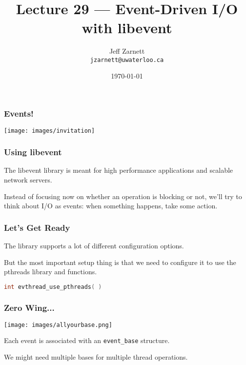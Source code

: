 

\title{Lecture 29 --- Event-Driven I/O with libevent }

\author{Jeff Zarnett \\ \small \texttt{jzarnett@uwaterloo.ca}}
\date{\today}




\begin{frame}
	\titlepage

\end{frame}



\begin{frame}
	\frametitle{Events!}

	\begin{center}
		\texttt{[image: images/invitation]}
	\end{center}


\end{frame}


\begin{frame}
	\frametitle{Using libevent}

	The libevent library is meant for high performance applications and scalable network servers.

	Instead of focusing now on whether an operation is blocking or not, we'll try to think about I/O as events: when something happens, take some action.

\end{frame}


\begin{frame}[fragile]
	\frametitle{Let's Get Ready}
	The library supports a lot of different configuration options.

	But the most important setup thing is that we need to configure it to use the pthreads library and functions.

	\begin{lstlisting}[language=C]
int evthread_use_pthreads( )
\end{lstlisting}

\end{frame}


\begin{frame}
	\frametitle{Zero Wing...}

	\begin{center}
		\texttt{[image: images/allyourbase.png]}
	\end{center}

	Each event is associated with an \texttt{event\_base} structure.

	We might need multiple bases for multiple thread operations.

\end{frame}

